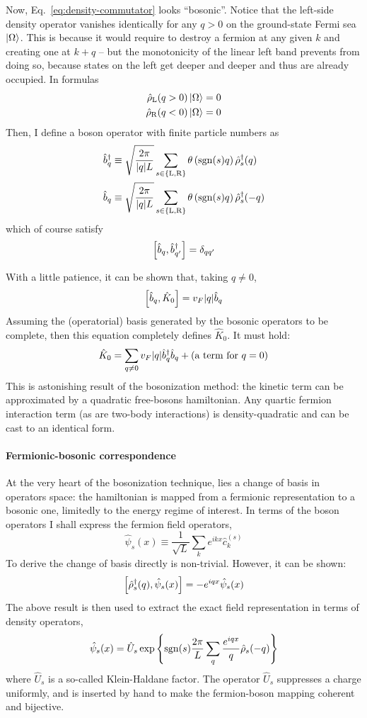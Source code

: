 Now, Eq.~\eqref{eq:density-commutator} looks ``bosonic''. Notice that the left-side density operator vanishes identically for any $q>0$ on the ground-state Fermi sea $\ket{\Omega}$. This is because it would require to destroy a fermion at any given $k$ and creating one at $k+q$ -- but the monotonicity of the linear left band prevents from doing so, because states on the left get deeper and deeper and thus are already occupied. In formulas
\[
\begin{aligned}
	\hat \rho_\mathrm{L} (q>0) \ket{\Omega} &= 0 \\
	\hat \rho_\mathrm{R} (q<0) \ket{\Omega} &= 0
\end{aligned}
\]
Then, I define a boson operator with finite particle numbers as
\[
\begin{aligned}
	\hat b_q^\dagger &\equiv \sqrt{\frac{2\pi}{\abs{q}L}} \sum_{s \in \left\{\mathrm L, \mathrm R\right\}} \theta \left(\mathrm{sgn}(s) q\right) \hat \rho_s^\dagger (q) \\
	\hat b_q &\equiv \sqrt{\frac{2\pi}{\abs{q}L}} \sum_{s \in \left\{\mathrm L, \mathrm R\right\}} \theta \left(\mathrm{sgn}(s) q\right) \hat \rho_s^\dagger (-q)
\end{aligned}
\]
which of course satisfy
\[
	\comm{\hat b_q}{\hat b_{q'}^\dagger} = \delta_{qq'}
\]

With a little patience, it can be shown that, taking $q \neq 0$,
\begin{equation}\label{eq:boson-hamiltonian-commutator}
	\comm{\hat b_q}{\hat K_0} = v_F \abs{q} \hat b_q
\end{equation}
Assuming the (operatorial) basis generated by the bosonic operators to be complete, then this equation completely defines $\hat K_0$. It must hold:
\[
	\hat K_0 = \sum_{q \neq 0} v_F \abs{q} \hat b_q^\dagger \hat b_q + (\text{a term for $q=0$})
\]
This is astonishing result of the bosonization method: the kinetic term can be approximated by a quadratic free-bosons hamiltonian. Any quartic fermion interaction term (as are two-body interactions) is density-quadratic and can be cast to an identical form.

\paragraph{Fermionic-bosonic correspondence}
At the very heart of the bosonization technique, lies a change of basis in operators space: the hamiltonian is mapped from a fermionic representation to a bosonic one, limitedly to the energy regime of interest. In terms of the boson operators I shall express the fermion field operators,
\[
	\hat \psi_s (x) \equiv \frac{1}{\sqrt{L}} \sum_k e^{ikx} \hat c_k^{(s)}
\]
To derive the change of basis directly is non-trivial. However, it can be shown:
\[
	\comm{\hat \rho_s^\dagger (q)}{\hat \psi_s (x)} = -e^{iqx} \hat \psi_s (x)
\]
The above result is then used to extract the exact field representation in terms of density operators,
\[
	\hat \psi_s (x) = \hat U_s \exp\left\{ \mathrm{sgn}(s) \frac{2\pi}{L} \sum_q \frac{e^{iqx}}{q} \hat \rho_s (-q) \right\}
\]
where $\hat U_s$ is a so-called Klein-Haldane factor. The operator $\hat U_s$ suppresses a charge uniformly, and is inserted by hand to make the fermion-boson mapping coherent and bijective.

